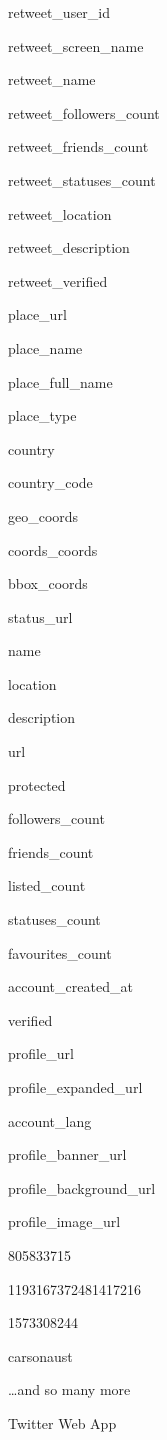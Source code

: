 \documentclass[]{book}
\begin{document}
retweet\_user\_id

retweet\_screen\_name

retweet\_name

retweet\_followers\_count

retweet\_friends\_count

retweet\_statuses\_count

retweet\_location

retweet\_description

retweet\_verified

place\_url

place\_name

place\_full\_name

place\_type

country

country\_code

geo\_coords

coords\_coords

bbox\_coords

status\_url

name

location

description

url

protected

followers\_count

friends\_count

listed\_count

statuses\_count

favourites\_count

account\_created\_at

verified

profile\_url

profile\_expanded\_url

account\_lang

profile\_banner\_url

profile\_background\_url

profile\_image\_url

805833715

1193167372481417216

1573308244

carsonaust

\citet{ProfTalmadge} \citet{ProfSaunders} \citet{ANewman_forward} \citet{Kat_McNamara} \citet{IRgetsreal} \citet{dbyman} \citet{dmedelstein} \citet{dhnexon} \citet{ErikVoeten} \citet{irfannooruddin} \ldots{}and so many more

Twitter Web App
\end{document}
